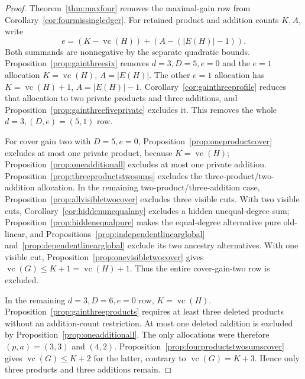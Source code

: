 \documentclass[11pt]{article}
\newcommand{\vc}{\operatorname{vc}}
\theoremstyle{definition}
\theoremstyle{remark}
\begin{document}
\begin{proof}
Theorem~\ref{thm:maxfour} removes the maximal-gain row from Corollary~\ref{cor:fourmissingledger}. For retained product and addition counts $K,A$, write
\[
 e=(K-\vc(H))+(A-(|E(H)|-1)).
\]
Both summands are nonnegative by the separate quadratic bounds. Proposition~\ref{prop:gainthreesix} removes $d=3,D=5,e=0$ and the $e=1$ allocation $K=\vc(H)$, $A=|E(H)|$. The other $e=1$ allocation has $K=\vc(H)+1$, $A=|E(H)|-1$. Corollary~\ref{cor:gainthreeprofile} reduces that allocation to two private products and three additions, and Proposition~\ref{prop:gainthreefiveprivate} excludes it. This removes the whole $d=3,(D,e)=(5,1)$ row.

For cover gain two with $D=5,e=0$, Proposition~\ref{prop:oneproductcover} excludes at most one private product, because $K=\vc(H)$; Proposition~\ref{prop:oneadditionall} excludes at most one private addition. Proposition~\ref{prop:threeproductstwosums} excludes the three-product/two-addition allocation. In the remaining two-product/three-addition case, Proposition~\ref{prop:allvisibletwocover} excludes three visible cuts. With two visible cuts, Corollary~\ref{cor:hiddenunequalany} excludes a hidden unequal-degree sum; Proposition~\ref{prop:hiddenequalpure} makes the equal-degree alternative pure old-linear, and Propositions~\ref{prop:independentlinearglobal} and~\ref{prop:dependentlinearglobal} exclude its two ancestry alternatives. With one visible cut, Proposition~\ref{prop:onevisibletwocover} gives $\vc(G)\le K+1=\vc(H)+1$. Thus the entire cover-gain-two row is excluded.

In the remaining $d=3,D=6,e=0$ row, $K=\vc(H)$. Proposition~\ref{prop:gainthreeproducts} requires at least three deleted products without an addition-count restriction. At most one deleted addition is excluded by Proposition~\ref{prop:oneadditionall}. The only allocations were therefore $(p,a)=(3,3)$ and $(4,2)$. Proposition~\ref{prop:fourproductstwosumscover} gives $\vc(G)\le K+2$ for the latter, contrary to $\vc(G)=K+3$. Hence only three products and three additions remain.


\end{proof}
\end{document}
